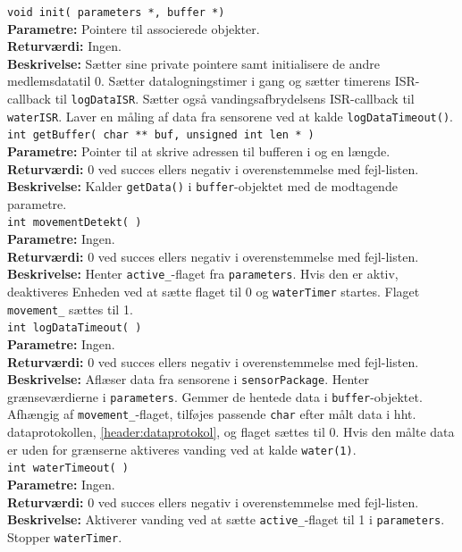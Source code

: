 \verb+void init( parameters *, buffer *)+\\
\textbf{Parametre:} Pointere til associerede objekter. \\
\textbf{Returværdi:} Ingen. \\
\textbf{Beskrivelse:} Sætter sine private pointere samt initialisere de andre medlemsdatatil 0. Sætter datalogningstimer i gang og sætter timerens ISR-callback til \verb+logDataISR+. Sætter også vandingsafbrydelsens ISR-callback til \verb+waterISR+. Laver en måling af data fra sensorene ved at kalde \verb+logDataTimeout()+. \\

\verb+int getBuffer( char ** buf, unsigned int len * )+ \\
\textbf{Parametre:} Pointer til at skrive adressen til bufferen i og en længde. \\
\textbf{Returværdi:} 0 ved succes ellers negativ i overenstemmelse med fejl-listen. \\
\textbf{Beskrivelse:} Kalder \verb+getData()+ i \verb+buffer+-objektet med de modtagende parametre.\\

\verb+int movementDetekt( )+ \\
\textbf{Parametre:} Ingen. \\
\textbf{Returværdi:} 0 ved succes ellers negativ i overenstemmelse med fejl-listen. \\
\textbf{Beskrivelse:} Henter \verb+active_+-flaget fra \verb+parameters+. Hvis den er aktiv, deaktiveres Enheden ved at sætte flaget til 0 og \verb+waterTimer+ startes. Flaget \verb+movement_+ sættes til 1. \\

\verb+int logDataTimeout( )+ \\
\textbf{Parametre:} Ingen. \\
\textbf{Returværdi:} 0 ved succes ellers negativ i overenstemmelse med fejl-listen. \\
\textbf{Beskrivelse:} Aflæser data fra sensorene i \verb+sensorPackage+. Henter grænseværdierne i \verb+parameters+. Gemmer de hentede data i \verb+buffer+-objektet. Afhængig af \verb+movement_+-flaget, tilføjes passende \verb+char+ efter målt data i hht. dataprotokollen, \ref{header:dataprotokol}, og flaget sættes til 0. Hvis den målte data er uden for grænserne aktiveres vanding ved at kalde \verb+water(1)+.\\

\verb+int waterTimeout( )+ \\
\textbf{Parametre:} Ingen. \\
\textbf{Returværdi:} 0 ved succes ellers negativ i overenstemmelse med fejl-listen. \\
\textbf{Beskrivelse:} Aktiverer vanding ved at sætte \verb+active_+-flaget til 1 i \verb+parameters+. Stopper \verb+waterTimer+. \\


